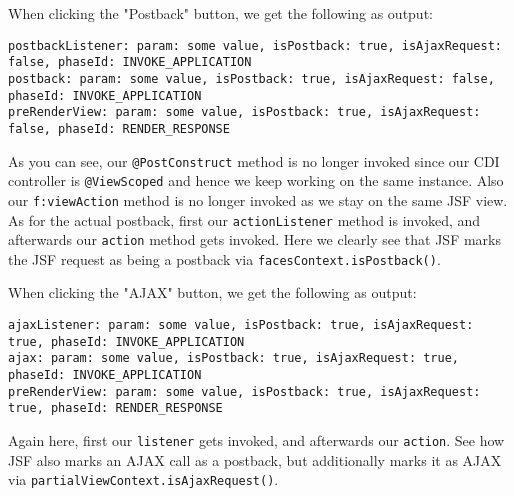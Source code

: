 When clicking the "Postback" button, we get the following as output:
\begin{lstlisting}
postbackListener: param: some value, isPostback: true, isAjaxRequest: false, phaseId: INVOKE_APPLICATION
postback: param: some value, isPostback: true, isAjaxRequest: false, phaseId: INVOKE_APPLICATION
preRenderView: param: some value, isPostback: true, isAjaxRequest: false, phaseId: RENDER_RESPONSE
\end{lstlisting}
As you can see, our \texttt{@PostConstruct} method is no longer invoked since our CDI controller is \texttt{@ViewScoped} and hence we keep working on the same instance. Also our \texttt{f:viewAction} method is no longer invoked as we stay on the same JSF view.
As for the actual postback, first our \texttt{actionListener} method is invoked, and afterwards our \texttt{action} method gets invoked.
Here we clearly see that JSF marks the JSF request as being a postback via \texttt{facesContext.isPostback()}.

When clicking the "AJAX" button, we get the following as output:
\begin{lstlisting}
ajaxListener: param: some value, isPostback: true, isAjaxRequest: true, phaseId: INVOKE_APPLICATION
ajax: param: some value, isPostback: true, isAjaxRequest: true, phaseId: INVOKE_APPLICATION
preRenderView: param: some value, isPostback: true, isAjaxRequest: true, phaseId: RENDER_RESPONSE
\end{lstlisting}
Again here, first our \texttt{listener} gets invoked, and afterwards our \texttt{action}.
See how JSF also marks an AJAX call as a postback, but additionally marks it as AJAX via \texttt{partialViewContext.isAjaxRequest()}.

